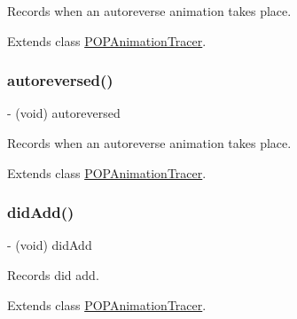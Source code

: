 Records when an autoreverse animation takes place. 

Extends class \mbox{\hyperlink{interface_p_o_p_animation_tracer_a641c94b868612f3d5b92b24cc4098517}{P\+O\+P\+Animation\+Tracer}}.

\mbox{\label{category_p_o_p_animation_tracer_07_internal_08_a641c94b868612f3d5b92b24cc4098517}} 
\subsubsection{\texorpdfstring{autoreversed()}{autoreversed()}\hspace{0.1cm}{\footnotesize\ttfamily [2/2]}}
{\footnotesize\ttfamily -\/ (void) autoreversed \begin{DoxyParamCaption}{ }\end{DoxyParamCaption}}

Records when an autoreverse animation takes place. 

Extends class \mbox{\hyperlink{interface_p_o_p_animation_tracer_a641c94b868612f3d5b92b24cc4098517}{P\+O\+P\+Animation\+Tracer}}.

\mbox{\label{category_p_o_p_animation_tracer_07_internal_08_ad853415c050d51eea5ca62c154e9e94a}} 
\subsubsection{\texorpdfstring{did\+Add()}{didAdd()}\hspace{0.1cm}{\footnotesize\ttfamily [1/2]}}
{\footnotesize\ttfamily -\/ (void) did\+Add \begin{DoxyParamCaption}{ }\end{DoxyParamCaption}}

Records did add. 

Extends class \mbox{\hyperlink{interface_p_o_p_animation_tracer_ad853415c050d51eea5ca62c154e9e94a}{P\+O\+P\+Animation\+Tracer}}.

